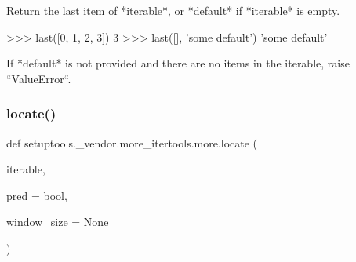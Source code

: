 \begin{DoxyVerb}Return the last item of *iterable*, or *default* if *iterable* is
empty.

    >>> last([0, 1, 2, 3])
    3
    >>> last([], 'some default')
    'some default'

If *default* is not provided and there are no items in the iterable,
raise ``ValueError``.
\end{DoxyVerb}
 \mbox{\label{namespacesetuptools_1_1__vendor_1_1more__itertools_1_1more_a35444700693b3657e4b259463067ce02}} 
\subsubsection{\texorpdfstring{locate()}{locate()}}
{\footnotesize\ttfamily def setuptools.\+\_\+vendor.\+more\+\_\+itertools.\+more.\+locate (\begin{DoxyParamCaption}\item[{}]{iterable,  }\item[{}]{pred = {\ttfamily bool},  }\item[{}]{window\+\_\+size = {\ttfamily None} }\end{DoxyParamCaption})}

